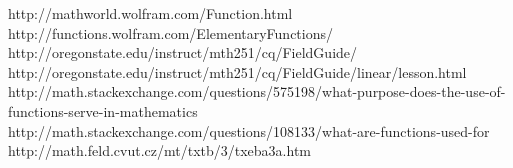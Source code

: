 \documentclass{amsart}
\begin{document}
\begin{thebibliography}{10}

 http://mathworld.wolfram.com/Function.html
 http://functions.wolfram.com/ElementaryFunctions/
 http://oregonstate.edu/instruct/mth251/cq/FieldGuide/
 http://oregonstate.edu/instruct/mth251/cq/FieldGuide/linear/lesson.html
 http://math.stackexchange.com/questions/575198/what-purpose-does-the-use-of-functions-serve-in-mathematics
 http://math.stackexchange.com/questions/108133/what-are-functions-used-for
 http://math.feld.cvut.cz/mt/txtb/3/txeba3a.htm

\end{thebibliography}
\end{document}
